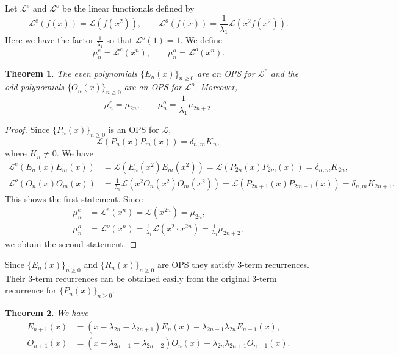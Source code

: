\documentclass[oneside]{book}
\numberwithin{equation}{section}
\newtheorem{thm}{Theorem}[section]
\theoremstyle{definition}
\newcommand\LL{\mathcal{L}}
\begin{document}
Let \( \LL^e \) and \( \LL^o \) be the linear functionals defined by
\[
  \LL^{e}(f(x)) = \LL(f(x^2)), \qquad 
  \LL^{o}(f(x)) = \frac{1}{\lambda_1} \LL(x^2f(x^2)).
\]
Here we have the factor \( \frac{1}{\lambda_1} \) so that
\( \LL^o(1) = 1 \).
We define
\[
  \mu^e_n = \LL^e(x^n), \qquad \mu^o_n = \LL^o(x^n).
\]

\begin{thm}\label{thm:18}
  The even polynomials \( \{E_n(x)\}_{n\ge0} \) are an OPS for
  \( \LL^e \) and the odd polynomials \( \{O_n(x)\}_{n\ge0} \) are an
  OPS for \( \LL^o \). Moreover, 
\[
  \mu^e_n = \mu_{2n} , \qquad \mu^o_n = \frac{1}{\lambda_1}
  \mu_{2n+2}.
\]
\end{thm}

\begin{proof}
  Since \( \{ P_n(x) \}_{n\ge 0} \) is an OPS for \( \LL \),
  \[
    \LL(P_n(x)P_m(x)) = \delta_{n,m}K_n,
  \]
  where \( K_n\ne 0 \). We have
  \begin{align*}
    \LL^e(E_n(x)E_m(x))
    &= \LL(E_n(x^2)E_m(x^2)) = \LL(P_{2n}(x)P_{2m}(x)) = \delta_{n,m} K_{2n},\\
    \LL^o(O_n(x)O_m(x))
    &= \frac{1}{\lambda_1}\LL(x^2O_n(x^2)O_m(x^2)) = \LL(P_{2n+1}(x)P_{2m+1}(x)) = \delta_{n,m} K_{2n+1}.
  \end{align*}
  This shows the first statement. Since
  \begin{align*}
    \mu^e_n &= \LL^e(x^n) = \LL(x^{2n}) = \mu_{2n}, \\
    \mu^o_n &= \LL^o(x^n) = \frac{1}{\lambda_1}\LL(x^2\cdot x^{2n}) = \frac{1}{\lambda_1} \mu_{2n+2},
  \end{align*}
  we obtain the second statement.
\end{proof}

Since \( \{E_n(x)\}_{n\ge0} \) and \( \{R_n(x)\}_{n\ge0} \) are OPS
they satisfy 3-term recurrences. Their 3-term recurrences can be
obtained easily from the original 3-term recurrence for
\( \{ P_n(x) \}_{n\ge 0} \).

\begin{thm}\label{thm:19}
  We have
\begin{align*}
  E_{n+1}(x) &= (x-\lambda_{2n}-\lambda_{2n+1}) E_n(x)
   - \lambda_{2n-1}\lambda_{2n}E_{n-1}(x),\\
  O_{n+1}(x) &= (x-\lambda_{2n+1}-\lambda_{2n+2}) O_n(x)
   - \lambda_{2n}\lambda_{2n+1}O_{n-1}(x).
\end{align*}
\end{thm}
\end{document}
